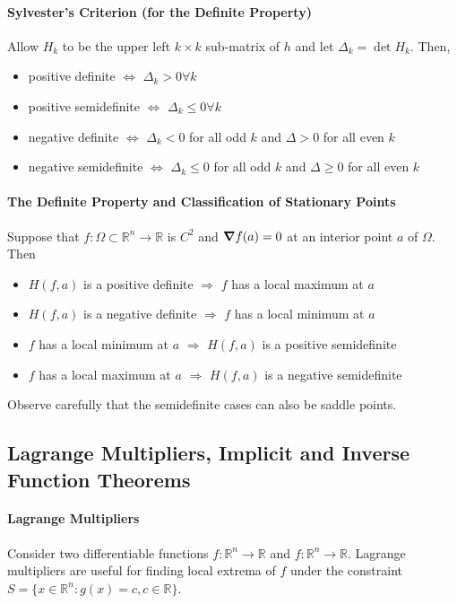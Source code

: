 \paragraph{Sylvester's Criterion (for the Definite Property)}
Allow \(H_k\) to be the upper left \(k\times k\) sub-matrix of \(h\)
and let \(\Delta_k = \det H_k\).
Then,
\begin{itemize}
    \item positive definite        \quad \(\Leftrightarrow\) \(\Delta_k > 0 \forall k\)
    \item positive semidefinite    \quad \(\Leftrightarrow\) \(\Delta_k \leq 0 \forall k\)
    \item negative definite        \quad \(\Leftrightarrow\) \(\Delta_k < 0\)  for all odd \(k\) and \(\Delta > 0\) for all even \(k\)
    \item negative semidefinite        \quad \(\Leftrightarrow\) \(\Delta_k \leq 0\)  for all odd \(k\) and \(\Delta \geq 0\) for all even \(k\)
\end{itemize}

\paragraph{The Definite Property and Classification of Stationary Points}
Suppose that \(f: \Omega\subset \mathbb{R}^n\to \mathbb{R}\) is \(C^2\)
and \(\grad f (a) = 0\) at an interior point \(a\) of \(\Omega\).
Then
\begin{itemize}
    \item \(H(f, a)\) is a positive definite \(\Rightarrow\) \(f\) has a local maximum at \(a\)
    \item \(H(f, a)\) is a negative definite \(\Rightarrow\) \(f\) has a local minimum at \(a\)
    \item \(f\) has a local minimum at \(a\) \(\Rightarrow\) \(H(f,a)\) is a positive semidefinite
    \item \(f\) has a local maximum at \(a\) \(\Rightarrow\) \(H(f,a)\) is a negative semidefinite
\end{itemize}
Observe carefully that the semidefinite cases can also be saddle points.

\subsection{Lagrange Multipliers, Implicit and Inverse Function Theorems}

\paragraph{Lagrange Multipliers}
Consider two differentiable functions
\(f: \mathbb{R}^n \to \mathbb{R} \) and \(f: \mathbb{R}^n \to \mathbb{R}\).
Lagrange multipliers are useful for finding local extrema of \(f\)
under the constraint \(S = \{x \in\mathbb{R}^n : g(x) = c, c\in \mathbb{R}\}\).

